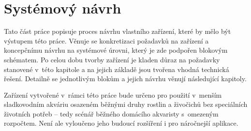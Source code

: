 \chapter{Systémový návrh}

Tato část práce popisuje proces návrhu vlastního zařízení, které by mělo být výstupem této práce. Věnuje se konkretizaci požadavků na zařízení a koncepčnímu návrhu na systémové úrovni, který je zde podpořen blokovým schématem. Po celou dobu tvorby zařízení je kladen důraz na požadavky stanovené v~této kapitole a na jejich základě jsou tvořena vhodná technická řešení.  Detailně se jednotlivým blokům a jejich návrhu věnují následující kapitoly.

Zařízení vytvořené v~rámci této práce bude určeno pro použití v~menším sladkovodním akváriu osazeném běžnými druhy rostlin a živočichů bez speciálních životních potřeb -- tedy scénář běžného domácího akvaristy s~omezeným rozpočtem. Není ale vyloučeno jeho budoucí rozšíření i pro náročnejší aplikace.














